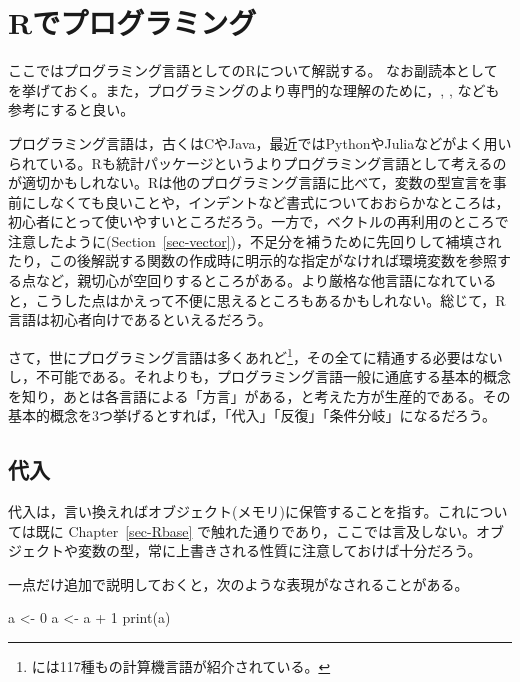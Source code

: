 \documentclass[
  a4paper,
]{ltjsbook}
\newenvironment{Shaded}{\begin{snugshade}}{\end{snugshade}}
\newcommand{\DecValTok}[1]{\textcolor[rgb]{0.68,0.00,0.00}{#1}}
\newcommand{\FunctionTok}[1]{\textcolor[rgb]{0.28,0.35,0.67}{#1}}
\newcommand{\NormalTok}[1]{\textcolor[rgb]{0.00,0.23,0.31}{#1}}
\newcommand{\OtherTok}[1]{\textcolor[rgb]{0.00,0.23,0.31}{#1}}
\newcommand{\SpecialCharTok}[1]{\textcolor[rgb]{0.37,0.37,0.37}{#1}}
\begin{document}

\chapter{Rでプログラミング}\label{rux3067ux30d7ux30edux30b0ux30e9ux30dfux30f3ux30b0}

ここではプログラミング言語としてのRについて解説する。 なお副読本として
\textcite{kosugi2023}
を挙げておく。また，プログラミングのより専門的な理解のために，\textcite{Jared_P_Lander2018-12-28},
\textcite{Ren_Kun2017-11-23}, \textcite{Hadley_Wickham2016-02-10}
なども参考にすると良い。

プログラミング言語は，古くはCやJava，最近ではPythonやJuliaなどがよく用いられている。Rも統計パッケージというよりプログラミング言語として考えるのが適切かもしれない。Rは他のプログラミング言語に比べて，変数の型宣言を事前にしなくても良いことや，インデントなど書式についておおらかなところは，初心者にとって使いやすいところだろう。一方で，ベクトルの再利用のところで注意したように(Section~\ref{sec-vector})，不足分を補うために先回りして補填されたり，この後解説する関数の作成時に明示的な指定がなければ環境変数を参照する点など，親切心が空回りするところがある。より厳格な他言語になれていると，こうした点はかえって不便に思えるところもあるかもしれない。総じて，R言語は初心者向けであるといえるだろう。

さて，世にプログラミング言語は多くあれど\footnote{\textcite{Language2016}
  には117種もの計算機言語が紹介されている。}，その全てに精通する必要はないし，不可能である。それよりも，プログラミング言語一般に通底する基本的概念を知り，あとは各言語による「方言」がある，と考えた方が生産的である。その基本的概念を3つ挙げるとすれば，「代入」「反復」「条件分岐」になるだろう。

\section{代入}\label{ux4ee3ux5165}

代入は，言い換えればオブジェクト(メモリ)に保管することを指す。これについては既に
Chapter~\ref{sec-Rbase}
で触れた通りであり，ここでは言及しない。オブジェクトや変数の型，常に上書きされる性質に注意しておけば十分だろう。

一点だけ追加で説明しておくと，次のような表現がなされることがある。

\begin{Shaded}
\begin{Highlighting}[]
\NormalTok{a }\OtherTok{\textless{}{-}} \DecValTok{0}
\NormalTok{a }\OtherTok{\textless{}{-}}\NormalTok{ a }\SpecialCharTok{+} \DecValTok{1}
\FunctionTok{print}\NormalTok{(a)}
\end{Highlighting}
\end{Shaded}
\end{document}
